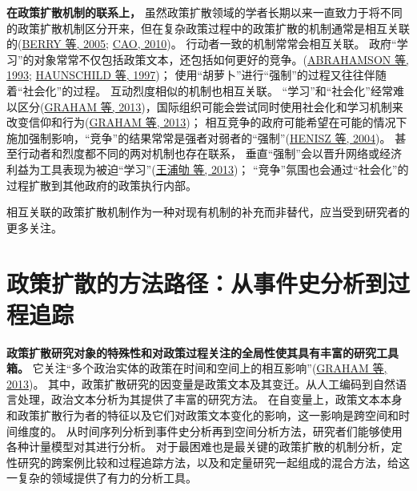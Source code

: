 \documentclass[
  12pt,
]{ctexart}
\begin{document}
\textbf{在政策扩散机制的联系上，}
虽然政策扩散领域的学者长期以来一直致力于将不同的政策扩散机制区分开来，但在复杂政策过程中的政策扩散的机制通常是相互关联的(\protect\hyperlink{ref-BerryBaybeck2005}{BERRY 等, 2005}; \protect\hyperlink{ref-Cao2010}{CAO, 2010})。
行动者一致的机制常常会相互关联。
政府``学习''的对象常常不仅包括政策文本，还包括如何更好的竞争。(\protect\hyperlink{ref-AbrahamsonRosenkopf1993}{ABRAHAMSON 等, 1993}; \protect\hyperlink{ref-HaunschildMiner1997}{HAUNSCHILD 等, 1997})；
使用``胡萝卜''进行``强制''的过程又往往伴随着``社会化''的过程。
互动烈度相似的机制也相互关联。
``学习''和``社会化''经常难以区分(\protect\hyperlink{ref-GrahamEtAl2013}{GRAHAM 等, 2013})，国际组织可能会尝试同时使用社会化和学习机制来改变信仰和行为(\protect\hyperlink{ref-GrahamEtAl2013}{GRAHAM 等, 2013})；
相互竞争的政府可能希望在可能的情况下施加强制影响，``竞争''的结果常常是强者对弱者的``强制''(\protect\hyperlink{ref-HeniszEtAl2004}{HENISZ 等, 2004})。
甚至行动者和烈度都不同的两对机制也存在联系，
垂直``强制''会以晋升网络或经济利益为工具表现为被迫``学习''(\protect\hyperlink{ref-WangPuQuLaiXianJin2013}{王浦劬 等, 2013})；
``竞争''氛围也会通过``社会化''的过程扩散到其他政府的政策执行内部。

相互关联的政策扩散机制作为一种对现有机制的补充而非替代，应当受到研究者的更多关注。

\newpage

\hypertarget{ux653fux7b56ux6269ux6563ux7684ux65b9ux6cd5ux8defux5f84ux4eceux4e8bux4ef6ux53f2ux5206ux6790ux5230ux8fc7ux7a0bux8ffdux8e2a}{%
\section{政策扩散的方法路径：从事件史分析到过程追踪}\label{ux653fux7b56ux6269ux6563ux7684ux65b9ux6cd5ux8defux5f84ux4eceux4e8bux4ef6ux53f2ux5206ux6790ux5230ux8fc7ux7a0bux8ffdux8e2a}}

\textbf{政策扩散研究对象的特殊性和对政策过程关注的全局性使其具有丰富的研究工具箱。}
它关注``多个政治实体的政策在时间和空间上的相互影响''(\protect\hyperlink{ref-GrahamEtAl2013}{GRAHAM 等, 2013})。
其中，政策扩散研究的因变量是政策文本及其变迁。从人工编码到自然语言处理，政治文本分析为其提供了丰富的研究方法。
在自变量上，政策文本本身和政策扩散行为者的特征以及它们对政策文本变化的影响，这一影响是跨空间和时间维度的。
从时间序列分析到事件史分析再到空间分析方法，研究者们能够使用各种计量模型对其进行分析。
对于最困难也是最关键的政策扩散的机制分析，定性研究的跨案例比较和过程追踪方法，以及和定量研究一起组成的混合方法，给这一复杂的领域提供了有力的分析工具。
\end{document}
